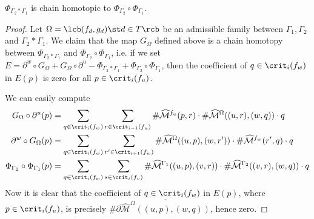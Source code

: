 \begin{prop}
\label{concatenation of paths induces composition}
$\Phi_{\Gamma_2 * \Gamma_1}$ is chain homotopic to $\Phi_{\Gamma_2} \circ \Phi_{\Gamma_1}$.
\end{prop}
\begin{proof}
Let $\Omega = \lcb (f_d,g_d) \st d \in T \rcb$ be an admissible family between $\Gamma_1,\Gamma_2$ and $\Gamma_2*\Gamma_1$. We claim that the map $G_\Omega$ defined above is a chain homotopy between $\Phi_{\Gamma_2 * \Gamma_1}$ and $\Phi_{\Gamma_2} \circ \Phi_{\Gamma_1}$, i.e. if we set $E = \partial^w \circ G_\Omega + G_\Omega \circ \partial^u - \Phi_{\Gamma_2 * \Gamma_1} + \Phi_{\Gamma_2} \circ \Phi_{\Gamma_1}$, then the coefficient of $q \in \crit_i(f_w)$ in $E(p)$ is zero for all $p \in \crit_i(f_u)$.

We can easily compute
\begin{align*}
G_\Omega \circ \partial^u(p) &= \sum_{q \in \crit_i(f_w)} \sum_{r \in \crit_{i-1}(f_u)} \# \widehat{\mathcal M}^{f_u}(p,r) \cdot \#\widehat{\mathcal M}^\Omega((u,r),(w,q)) \cdot q \\
\partial^w \circ G_\Omega(p) &= \sum_{q \in \crit_i(f_w)} \sum_{r' \in \crit_{i+1}(f_w)} \# \widehat{\mathcal M}^\Omega((u,p),(w,r')) \cdot \# \widehat{\mathcal M}^{f_w}(r',q) \cdot q \\
\Phi_{\Gamma_2} \circ \Phi_{\Gamma_1}(p) &= \sum_{q \in \crit_i(f_w)} \sum_{s \in \crit_i(f_v)} \# \widehat{\mathcal M}^{\Gamma_1}((u,p),(v,r)) \cdot \# \widehat{\mathcal M}^{\Gamma_2}((v,r),(w,q)) \cdot q 
\end{align*}
Now it is clear that the coefficient of $q \in \crit_i(f_w)$ in $E(p)$, where $p \in \crit_i(f_u)$, is precisely $\# \partial \overline{\widehat{\mathcal M}^\Omega((u,p),(w,q))}$, hence zero.


\end{proof}

